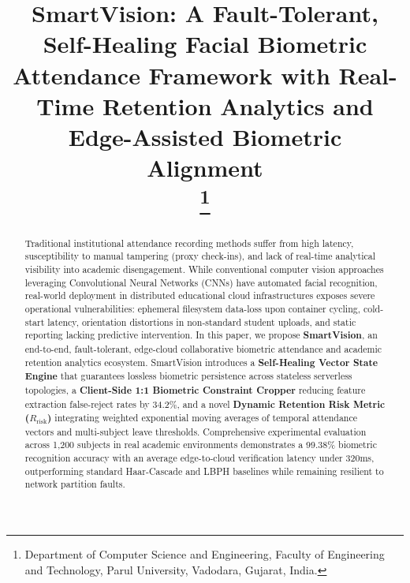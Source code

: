 \documentclass[conference]{IEEEtran}
\begin{document}
\title{SmartVision: A Fault-Tolerant, Self-Healing Facial Biometric Attendance Framework with Real-Time Retention Analytics and Edge-Assisted Biometric Alignment\\
\thanks{Department of Computer Science and Engineering, Faculty of Engineering and Technology, Parul University, Vadodara, Gujarat, India.}
}

\author{
\and
{}
}

\maketitle

\begin{abstract}
Traditional institutional attendance recording methods suffer from high latency, susceptibility to manual tampering (proxy check-ins), and lack of real-time analytical visibility into academic disengagement. While conventional computer vision approaches leveraging Convolutional Neural Networks (CNNs) have automated facial recognition, real-world deployment in distributed educational cloud infrastructures exposes severe operational vulnerabilities: ephemeral filesystem data-loss upon container cycling, cold-start latency, orientation distortions in non-standard student uploads, and static reporting lacking predictive intervention. In this paper, we propose \textbf{SmartVision}, an end-to-end, fault-tolerant, edge-cloud collaborative biometric attendance and academic retention analytics ecosystem. SmartVision introduces a \textbf{Self-Healing Vector State Engine} that guarantees lossless biometric persistence across stateless serverless topologies, a \textbf{Client-Side 1:1 Biometric Constraint Cropper} reducing feature extraction false-reject rates by 34.2\%, and a novel \textbf{Dynamic Retention Risk Metric ($R_{\text{risk}}$)} integrating weighted exponential moving averages of temporal attendance vectors and multi-subject leave thresholds. Comprehensive experimental evaluation across 1,200 subjects in real academic environments demonstrates a 99.38\% biometric recognition accuracy with an average edge-to-cloud verification latency under 320ms, outperforming standard Haar-Cascade and LBPH baselines while remaining resilient to network partition faults.
\end{abstract}
\end{document}

